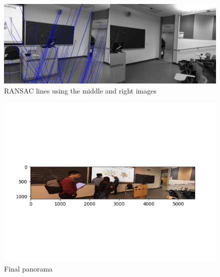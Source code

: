\documentclass[10pt]{article}
\begin{document}
	\begin{figure}[h]
		\caption{RANSAC lines using the middle and right images}
		\centering
		\includegraphics[scale=0.125]{matches_m2r.png}
	\end{figure}

	\begin{figure}[h]
		\caption{Final panorama}
		\centering
		\includegraphics{panorama.png}
	\end{figure}
\end{document}

